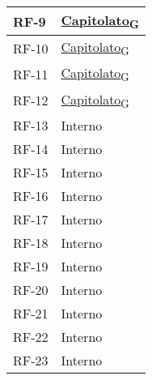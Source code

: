 \begin{longtable}{|>{\centering\arraybackslash}m{}|>{\centering\arraybackslash}m{}|}
	RF-9            & \href{https://7last.github.io/docs/pb/documentazione-interna/glossario\#capitolato}{Capitolato\textsubscript{G}} \\\hline
	RF-10           & \href{https://7last.github.io/docs/pb/documentazione-interna/glossario\#capitolato}{Capitolato\textsubscript{G}} \\\hline
	RF-11           & \href{https://7last.github.io/docs/pb/documentazione-interna/glossario\#capitolato}{Capitolato\textsubscript{G}} \\\hline
	RF-12           & \href{https://7last.github.io/docs/pb/documentazione-interna/glossario\#capitolato}{Capitolato\textsubscript{G}} \\\hline
	RF-13           & Interno                                                                                                           \\\hline
	RF-14           & Interno                                                                                                           \\\hline
	RF-15           & Interno                                                                                                           \\\hline
	RF-16           & Interno                                                                                                           \\\hline
	RF-17           & Interno                                                                                                           \\\hline
	RF-18           & Interno                                                                                                           \\\hline
	RF-19           & Interno                                                                                                           \\\hline
	RF-20           & Interno                                                                                                           \\\hline
	RF-21           & Interno                                                                                                           \\\hline
	RF-22           & Interno                                                                                                           \\\hline
	RF-23           & Interno                                                                                                           \\\hline

\end{longtable}

